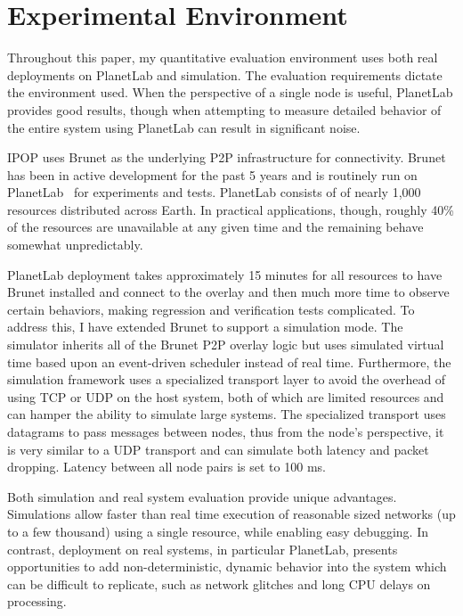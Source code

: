 \section{Experimental Environment}
\label{vpn:experimental}

Throughout this paper, my quantitative evaluation environment uses both real
deployments on PlanetLab and simulation.  The evaluation requirements dictate
the environment used.  When the perspective of a single node is useful,
PlanetLab provides good results, though when attempting to measure detailed
behavior of the entire system using PlanetLab can result in significant noise.

IPOP uses Brunet as the underlying P2P infrastructure for connectivity.  Brunet
has been in active development for the past 5 years and is routinely run on
PlanetLab~\cite{planetlab} for experiments and tests.  PlanetLab consists of of
nearly 1,000 resources distributed across Earth.  In practical applications,
though, roughly 40\% of the resources are unavailable at any given time and the
remaining behave somewhat unpredictably.

PlanetLab deployment takes approximately 15 minutes for all resources to have
Brunet installed and connect to the overlay and then much more time to observe
certain behaviors, making regression and verification tests complicated.  To
address this, I have extended Brunet to support a simulation mode. The
simulator inherits all of the Brunet P2P overlay logic but uses simulated
virtual time based upon an event-driven scheduler instead of real time.
Furthermore, the simulation framework uses a specialized transport layer to
avoid the overhead of using TCP or UDP on the host system, both of which are
limited resources and can hamper the ability to simulate large systems.   The
specialized transport uses datagrams to pass messages between nodes, thus from
the node's perspective, it is very similar to a UDP transport and can simulate
both latency and packet dropping.  Latency between all node pairs is set to 100
ms.

Both simulation and real system evaluation provide unique advantages.
Simulations allow faster than real time execution of reasonable sized networks
(up to a few thousand) using a single resource, while enabling easy debugging.
In contrast, deployment on real systems, in particular PlanetLab, presents
opportunities to add non-deterministic, dynamic behavior into the system which
can be difficult to replicate, such as network glitches and long CPU delays on
processing.

